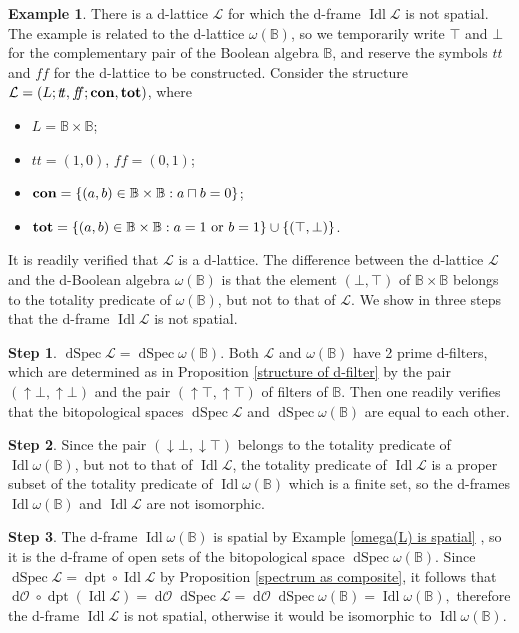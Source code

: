 \documentclass[11pt]{article}
\DeclareMathOperator{\idl}{Idl}
\DeclareMathOperator{\dSpec}{dSpec}
\DeclareMathOperator{\dO}{d\mathcal{O}}
\DeclareMathOperator{\dpt}{dpt}
\theoremstyle{plain}
\theoremstyle{definition}
\newtheorem{exmp}[thm]{Example}
\newcommand{\bbB}{\mathbb{B}}
\newcommand{\dbt}{{t\!t}}
\newcommand{\dbf}{{f\!\!f}}
\begin{document}
\begin{exmp}\label{idl is not always d-spatial} There is a d-lattice $\mathcal{L}$ for which the d-frame $\idl\mathcal{L}$ is not spatial. The example is related to the d-lattice $\omega(\bbB)$, so we temporarily write  $\top$ and $\bot$ for the complementary pair of the Boolean algebra $\bbB$, and reserve the symbols $\dbt$ and $\dbf$ for the d-lattice to be constructed.
Consider the structure $\mathcal{L}=(L;\dbt,\dbf;{\bf con},{\bf tot})$, where \begin{itemize} \setlength{\itemsep}{0pt}
\item   $L=\mathbb{B}\times\mathbb{B}$;   \item $\dbt=(1,0)$, $\dbf=(0,1)$; \item ${\bf con}=\{(a,b)\in \mathbb{B}\times \mathbb{B}: a\sqcap b=0\}$;  \item ${\bf tot}=\{(a,b)\in\mathbb{B}\times\mathbb{B}:a=1 ~ \text{or} ~ b=1\}\cup\{(\top,\bot) \}$. \end{itemize} It is readily verified that $\mathcal{L}$ is a d-lattice. The difference between the d-lattice $\mathcal{L}$ and the d-Boolean algebra $\omega(\bbB)$ is that the element $(\bot,\top)$ of $\bbB\times\bbB$ belongs to the totality predicate of  $\omega(\bbB)$, but not to that of $\mathcal{L}$. We show in three steps that the d-frame $\idl\mathcal{L}$ is not spatial. 

{\bf Step 1}.   $\dSpec\mathcal{L}=\dSpec \omega(\mathbb{B})$.  Both $\mathcal{L}$ and $\omega(\mathbb{B})$ have 2 prime d-filters, which are determined as in Proposition \ref{structure of d-filter} by the pair $(\uparrow\!\bot, \uparrow\!\bot)$ and  the pair $(\uparrow\!\top, \uparrow\!\top)$ of filters of $\bbB$.  Then one readily verifies that the bitopological spaces $\dSpec\mathcal{L}$ and  $\dSpec\omega(\mathbb{B})$ are equal to each other. 
 
{\bf Step 2}. Since the pair $(\downarrow\!\bot, \downarrow\!\top)$ belongs to the totality predicate of $\idl\omega(\mathbb{B})$, but not to that of $\idl\mathcal{L}$, the totality predicate of $\idl\mathcal{L}$ is a proper subset of the totality predicate of  $\idl\omega(\mathbb{B})$  which is  a finite set, so the d-frames $\idl\omega(\mathbb{B})$ and $\idl\mathcal{L}$ are not isomorphic.   

{\bf Step 3}. 
The d-frame $\idl\omega(\mathbb{B})$ is spatial by Example \ref{omega(L) is spatial} , so it is the d-frame of open sets of the bitopological space $\dSpec\omega(\mathbb{B})$. Since $\dSpec\mathcal{L} = \dpt\circ \idl\mathcal{L}$ by Proposition \ref{spectrum as composite}, it follows that  $\dO\circ\dpt(\idl\mathcal{L})  = \dO \dSpec\mathcal{L} = \dO \dSpec\omega(\bbB) =  \idl\omega(\mathbb{B}),$    therefore the d-frame $\idl\mathcal{L}$  is not spatial, otherwise it would be isomorphic to $\idl\omega(\mathbb{B})$. \end{exmp}   
   
\end{document}
